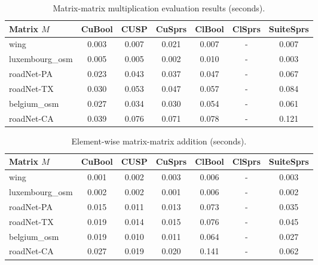 {\setlength{\tabcolsep}{0.3em}
\begin{table}[t]
\centering
{
\caption{Matrix-matrix multiplication evaluation results (seconds).}
\label{table:eval_mm_results}
\scriptsize
{}
\begin{tabular}{|l|c|c|c|c|c|c|}
\hline

Matrix $M$      & CuBool  & CUSP    & CuSprs  & ClBool  & ClSprs  & SuiteSprs \\
\hline
\hline
wing            & 0.003   & 0.007   & 0.021   & 0.007   & -       & 0.007   \\
luxembourg\_osm & 0.005   & 0.005   & 0.002   & 0.010   & -       & 0.003   \\
roadNet-PA      & 0.023   & 0.043   & 0.037   & 0.047   & -       & 0.067   \\
roadNet-TX      & 0.030   & 0.053   & 0.047   & 0.057   & -       & 0.084   \\
belgium\_osm    & 0.027   & 0.034   & 0.030   & 0.054   & -       & 0.061   \\
roadNet-CA      & 0.039   & 0.076   & 0.071   & 0.078   & -       & 0.121   \\

\hline
\end{tabular}
}
\end{table}
}

{\setlength{\tabcolsep}{0.3em}
\begin{table}[t]
\centering
{
\caption{Element-wise matrix-matrix addition (seconds).}
\label{table:eval_ma_results}
\scriptsize
{}
\begin{tabular}{|l|c|c|c|c|c|c|}
\hline

Matrix $M$      & CuBool  & CUSP    & CuSprs  & ClBool   & ClSprs  & SuiteSprs \\
\hline
\hline
wing            & 0.001   & 0.002   & 0.003   & 0.006    & -       & 0.003   \\
luxembourg\_osm & 0.002   & 0.002   & 0.001   & 0.006    & -       & 0.002   \\
roadNet-PA      & 0.015   & 0.011   & 0.013   & 0.073    & -       & 0.035   \\
roadNet-TX      & 0.019   & 0.014   & 0.015   & 0.076    & -       & 0.045   \\
belgium\_osm    & 0.019   & 0.010   & 0.011   & 0.064    & -       & 0.027   \\
roadNet-CA      & 0.027   & 0.019   & 0.020   & 0.141    & -       & 0.062   \\

\hline
\end{tabular}
}
\end{table}
}